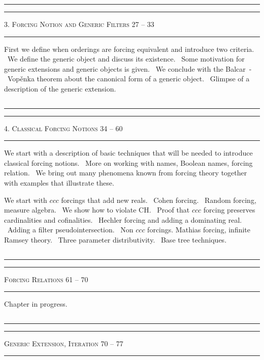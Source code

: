 ${}$\\[-0.1cm] \hrule\hrule
${}$\\[0.2cm]
{\scshape 3. Forcing Notion and Generic Filters \hfill 27 -- 33 } \\[-0.3cm]
\hrule
${}$\\[-0.1cm]

First we define when orderings are forcing equivalent and
introduce two criteria. \ We define the generic object and discuss
its existence. \  Some motivation for generic extensions and generic objects
is given. \ We conclude with the Balcar~-~Vopěnka theorem about the canonical
form of a generic object. \ Glimpse of a description of the generic extension.

${}$\\[-0.1cm] \hrule\hrule
${}$\\[0.2cm]
{\scshape 4. Classical Forcing Notions \hfill 34 -- 60 } \\[-0.3cm]
\hrule
${}$\\[-0.1cm]

\noindent We start with a description of basic techniques that will be needed to
introduce classical forcing notions. \ More on working with names, Boolean names,
forcing relation. \ We bring out many phenomena known
from forcing theory together with examples that illustrate these.

\smallskip

\noindent We start with $ccc$ forcings that add new reals. \ Cohen forcing. \
Random forcing, measure algebra. \ We show how to violate CH. \ Proof that $ccc$ forcing
preserves cardinalities and cofinalities. \ Hechler forcing and adding
a dominating real. \ Adding a filter pseudointersection. \ Non $ccc$ forcings.
Mathias forcing, infinite Ramsey theory. \ Three parameter distributivity. \
Base tree techniques.

${}$\\[-0.1cm]
\hrule\hrule
${}$\\[0.2cm]
{\scshape Forcing Relations \hfill 61 -- 70 } \\[-0.3cm]
\hrule
${}$\\[-0.1cm]

\noindent Chapter in progress.

${}$\\[-0.1cm] \hrule\hrule
${}$\\[0.2cm]
{\scshape Generic Extension, Iteration \hfill 70 -- 77 } \\[-0.3cm]
\hrule
${}$\\[-0.1cm]

